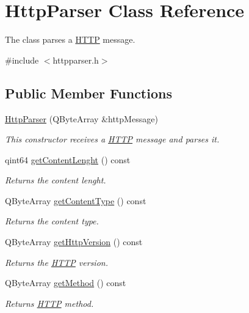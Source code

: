 \hypertarget{class_http_parser}{}\section{Http\+Parser Class Reference}
\label{class_http_parser}


The class parses a \hyperlink{namespace_h_t_t_p}{H\+T\+TP} message.  




{\ttfamily \#include $<$httpparser.\+h$>$}

\subsection*{Public Member Functions}
\begin{DoxyCompactItemize}
\item 
\hyperlink{class_http_parser_a91e6c1876337b53694347476f277d1a2}{Http\+Parser} (Q\+Byte\+Array \&http\+Message)
\begin{DoxyCompactList}\small\item\em This constructor receives a \hyperlink{namespace_h_t_t_p}{H\+T\+TP} message and parses it. \end{DoxyCompactList}\item 
qint64 \hyperlink{class_http_parser_ad42f6a0ff6ab987ccf526ac995af196f}{get\+Content\+Lenght} () const
\begin{DoxyCompactList}\small\item\em Returns the content lenght. \end{DoxyCompactList}\item 
Q\+Byte\+Array \hyperlink{class_http_parser_a3adf500c4b0cf85d8249e071a7094f20}{get\+Content\+Type} () const
\begin{DoxyCompactList}\small\item\em Returns the content type. \end{DoxyCompactList}\item 
Q\+Byte\+Array \hyperlink{class_http_parser_a760eb9ec81fa1983b8eb5b088b0e6f41}{get\+Http\+Version} () const
\begin{DoxyCompactList}\small\item\em Returns the \hyperlink{namespace_h_t_t_p}{H\+T\+TP} version. \end{DoxyCompactList}\item 
Q\+Byte\+Array \hyperlink{class_http_parser_a283aa2b313491a592babdb5528086f71}{get\+Method} () const
\begin{DoxyCompactList}\small\item\em Returns \hyperlink{namespace_h_t_t_p}{H\+T\+TP} method. \end{DoxyCompactList}\item 

\end{DoxyCompactItemize}
